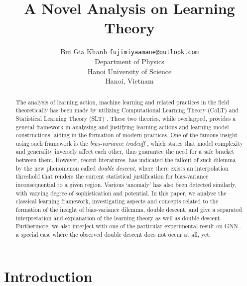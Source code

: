 \documentclass[twoside,10pt]{article}
\title{A Novel Analysis on Learning Theory}
\author{\name Bui Gia Khanh \email \texttt{fujimiyaamane@outlook.com} \\
       \addr Department of Physics\\
       Hanoi University of Science\\
       Hanoi, Vietnam}
\begin{document}
\maketitle

\begin{abstract}
    The analysis of learning action, machine learning and related practices in the field theoretically has been made by utilizing Computational Learning Theory (CoLT) \cite{10.1145/1968.1972} and Statistical Learning Theory (SLT) \cite{Vapnik1999-VAPTNO}. These two theories, while overlapped, provides a general framework in analysing and justifying learning actions and learning model constructions, aiding in the formation of modern practices. One of the famous insight using such framework is the \textit{bias-variance tradeoff} \cite{6797087}, which states that model complexity and generality inversely affect each other, thus guarantee the need for a safe bracket between them. However, recent literatures, \cite{belkin_reconciling_2019} has indicated the fallout of such dilemma by the new phenomenon called \textit{double descent}, where there exists an interpolation threshold that renders the current statistical justification for bias-variance inconsequential to a given region. Various `anomaly' has also been detected similarly, with varying degree of sophistication and potential. In this paper, we analyse the classical learning framework, investigating aspects and concepts related to the formation of the insight of bias-variance dilemma, double descent, and give a separated interpretation and explanation of the learning theory as well as double descent. Furthermore, we also interject with one of the particular experimental result on GNN - a special case where the observed double descent does not occur at all, yet.
\end{abstract}



\section{Introduction}
\end{document}
